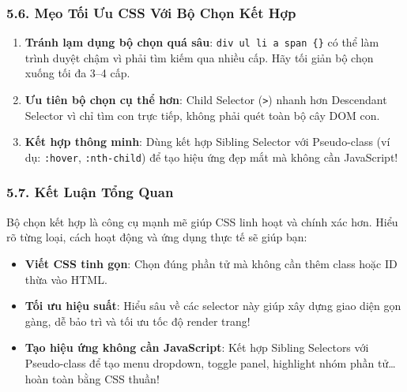 \documentclass[11pt,oneside]{book}
\newcommand{\codeinline}[1]{\textcolor{accentOrange}{\texttt{#1}}}
\begin{document}
\subsubsection{5.6. Mẹo Tối Ưu CSS Với Bộ Chọn Kết Hợp}

\begin{warnBox}
\begin{enumerate}[leftmargin=1.5em, itemsep=4pt, parsep=0pt]
    \item \textbf{Tránh lạm dụng bộ chọn quá sâu}: \codeinline{div ul li a span \{\}} có thể làm trình duyệt chậm vì phải tìm kiếm qua nhiều cấp. Hãy tối giản bộ chọn xuống tối đa 3--4 cấp.
    \item \textbf{Ưu tiên bộ chọn cụ thể hơn}: Child Selector (\codeinline{>}) nhanh hơn Descendant Selector vì chỉ tìm con trực tiếp, không phải quét toàn bộ cây DOM con.
    \item \textbf{Kết hợp thông minh}: Dùng kết hợp Sibling Selector với Pseudo-class (ví dụ: \codeinline{:hover}, \codeinline{:nth-child}) để tạo hiệu ứng đẹp mắt mà không cần JavaScript!
\end{enumerate}
\end{warnBox}

\subsubsection{5.7. Kết Luận Tổng Quan}

\begin{tipBox}
Bộ chọn kết hợp là công cụ mạnh mẽ giúp CSS linh hoạt và chính xác hơn. Hiểu rõ từng loại, cách hoạt động và ứng dụng thực tế sẽ giúp bạn:
\begin{itemize}[leftmargin=1.5em, itemsep=3pt, parsep=0pt]
    \item \textbf{Viết CSS tinh gọn}: Chọn đúng phần tử mà không cần thêm class hoặc ID thừa vào HTML.
    \item \textbf{Tối ưu hiệu suất}: Hiểu sâu về các selector này giúp xây dựng giao diện gọn gàng, dễ bảo trì và tối ưu tốc độ render trang!
    \item \textbf{Tạo hiệu ứng không cần JavaScript}: Kết hợp Sibling Selectors với Pseudo-class để tạo menu dropdown, toggle panel, highlight nhóm phần tử\ldots{} hoàn toàn bằng CSS thuần!
\end{itemize}
\end{tipBox}


\end{document}
